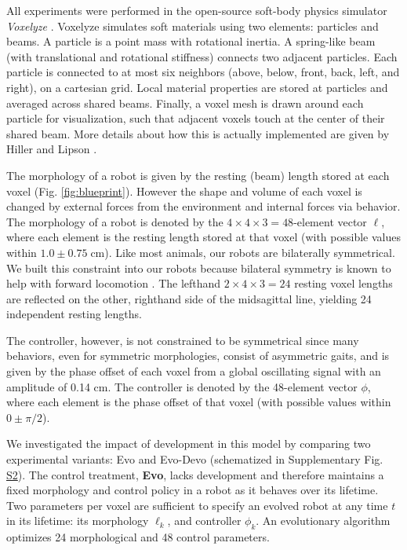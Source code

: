 All experiments were performed in the open-source soft-body physics simulator  
\textit{Voxelyze} \cite{hiller2014dynamic}. 
Voxelyze simulates soft materials using two elements: particles and beams. 
A particle is a point mass with rotational inertia.
A spring-like beam (with translational and rotational stiffness) connects two adjacent particles.
Each particle is connected to at most six neighbors (above, below, front, back, left, and right), on a cartesian grid.
Local material properties are stored at particles and averaged across shared beams.
Finally, a voxel mesh is drawn around each particle for visualization, such that adjacent voxels touch at the center of their shared beam.
More details about how this is actually implemented are given by Hiller and Lipson \cite{hiller2014dynamic}.

The morphology of a robot is given by the resting (beam) length stored at each voxel (Fig. \ref{fig:blueprint}).
However the shape and volume of each voxel is changed by external forces from the environment and internal forces via behavior. 
The morphology of a robot is denoted by the $4\times4\times3=48$-element vector $\ell$, where each element is the resting length stored at that voxel (with possible values within $1.0 \pm 0.75\; \text{cm}$).
Like most animals, our robots are bilaterally symmetrical.
We built this constraint into our robots because bilateral symmetry is known to help with forward locomotion
\cite{grabowsky1994symmetry}.
The lefthand $2\times4\times3=24$ resting voxel lengths are reflected on the other, righthand side of the midsagittal line, yielding 24 independent resting lengths.

The controller, however, is not constrained to be symmetrical since many behaviors, even for symmetric morphologies, consist of asymmetric gaits, and is given by the phase offset of each voxel from a global oscillating signal with an amplitude of 0.14 cm. 
The controller is denoted by the 48-element vector $\phi$, where each element is the phase offset of that voxel (with possible values within $0 \pm \pi/2$). 


We investigated the impact of development in this model by comparing two experimental variants: Evo and Evo-Devo (schematized in Supplementary Fig. \hyperref[fig:S2]{S2}). 
The control treatment, \textbf{Evo}, lacks development and therefore maintains a fixed morphology and control policy in a robot as it behaves over its lifetime. 
Two parameters per voxel are sufficient to specify an evolved robot at any time $t$ in its lifetime: its morphology $\ell_k$, and controller $\phi_k$.
An evolutionary algorithm optimizes 24 morphological and 48 control parameters.

